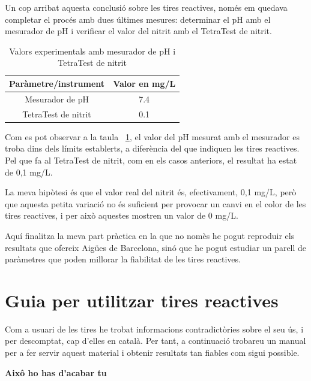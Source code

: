 Un cop arribat aquesta conclusió sobre les tires reactives, només em quedava completar el procés amb dues últimes mesures: determinar el pH amb el mesurador de pH i verificar el valor del nitrit amb el TetraTest de nitrit.
\begin{table}[H]
\centering
\begin{tabular}{|c|c|}
\hline
Paràmetre/instrument & Valor en mg/L \\
\hline
Mesurador de pH    & 7.4  \\
\hline
TetraTest de nitrit    & 0.1  \\
\hline
\end{tabular}%
\caption{Valors experimentals amb mesurador de pH i TetraTest de nitrit}
\label{tab:valors_tetra_pH}
\end{table}

Com es pot observar a la taula~ \ref{tab:valors_tetra_pH}, el valor del pH mesurat amb el mesurador es troba dins dels límits establerts, a diferència del que indiquen les tires reactives. Pel que fa al TetraTest de nitrit, com en els casos anteriors, el resultat ha estat de 0,1 mg/L.

La meva hipòtesi és que el valor real del nitrit és, efectivament, 0,1 mg/L, però que aquesta petita variació no és suficient per provocar un canvi en el color de les tires reactives, i per això aquestes mostren un valor de 0 mg/L.



Aquí finalitza la meva part pràctica en la que no nomès he pogut reproduir els resultats que ofereix Aigües de Barcelona, sinó que he pogut estudiar un parell de paràmetres que poden millorar la fiabilitat de les tires reactives.

\section{Guia per utilitzar tires reactives}

Com a usuari de les tires he trobat informacions contradictòries sobre el seu ús, i per descomptat, cap d'elles en català. Per tant, a continuació trobareu un manual per a fer servir aquest material i obtenir resultats tan fiables com sigui possible.

\textbf{Aixô ho has d'acabar tu}
